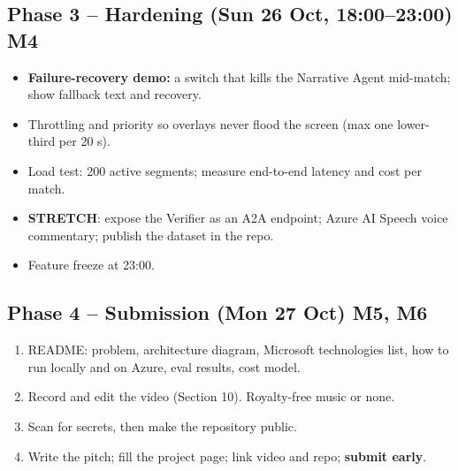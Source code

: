 \documentclass[11pt,a4paper]{article}
\newcommand{\stretchgoal}{\textbf{\color{pmgreen}STRETCH}}
\begin{document}
\subsection[Phase 3 -- Hardening (Sun 26 Oct, 18:00--23:00)]{Phase 3 -- Hardening (Sun 26 Oct, 18:00--23:00) \hfill M4}
\begin{itemize}
  \item \textbf{Failure-recovery demo:} a switch that kills the Narrative Agent mid-match; show fallback text and recovery.
  \item Throttling and priority so overlays never flood the screen (max one lower-third per 20 s).
  \item Load test: 200 active segments; measure end-to-end latency and cost per match.
  \item \stretchgoal: expose the Verifier as an A2A endpoint; Azure AI Speech voice commentary; publish the dataset in the repo.
  \item Feature freeze at 23:00.
\end{itemize}

\subsection[Phase 4 -- Submission (Mon 27 Oct)]{Phase 4 -- Submission (Mon 27 Oct) \hfill M5, M6}
\begin{enumerate}
  \item README: problem, architecture diagram, Microsoft technologies list, how to run locally and on Azure, eval results, cost model.
  \item Record and edit the video (Section 10). Royalty-free music or none.
  \item Scan for secrets, then make the repository public.
  \item Write the pitch; fill the project page; link video and repo; \textbf{submit early}.
\end{enumerate}

\end{document}
